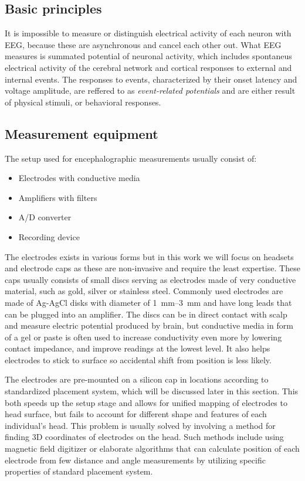 \subsection{Basic principles}
It is impossible to measure or distinguish electrical activity of each neuron
with EEG, because these are asynchronous and cancel each other out. 
What EEG measures is summated potential of neuronal activity, which includes
spontaneus electrical activity of the cerebral network and cortical responses to
external and internal events. The responses to events, characterized by their
onset latency and voltage amplitude, are reffered to as \emph{event-related
potentials} and are either result of physical stimuli, or behavioral responses.
\cite{bcComm} %


\subsection{Measurement equipment}
The setup used for encephalographic measurements usually consist of: 
\begin{itemize}
  \item Electrodes with conductive media
  \item Amplifiers with filters
  \item A/D converter
  \item Recording device
\end{itemize}
The electrodes exists in various forms but in this work we will focus on
headsets and electrode caps as these are non-invasive and require the least
expertise. These caps usually consists of small discs serving as electrodes made
of very conductive material, such as gold, silver or stainless steel. Commonly
used electrodes are made of Ag-AgCl disks with diameter of \SIrange[range-units
= single]{1}{3}{\mm} and have long leads that can be plugged into an
amplifier. \cite{eegFund} The discs can be in direct contact with scalp and
measure electric potential produced by brain, but conductive media in form of a
gel or paste is often used to increase conductivity even more by lowering
contact impedance, and improve readings at the lowest level. It also helps
electrodes to stick to surface so accidental shift from position is less likely.

The electrodes are pre-mounted on a silicon cap in locations according to
standardized placement system, which will be discussed later in this section.
This both speeds up the setup stage and allows for unified mapping of electrodes
to head surface, but fails to account for different shape and features of each
individual's head. \cite{eegFund} This problem is usually solved by involving a
method for finding 3D coordinates of electrodes on the head. Such methods
include using magnetic field digitizer or elaborate algorithms that can
calculate position of each electrode from few distance and angle measurements by
utilizing specific properties of standard placement system. \cite{rapidPos}

